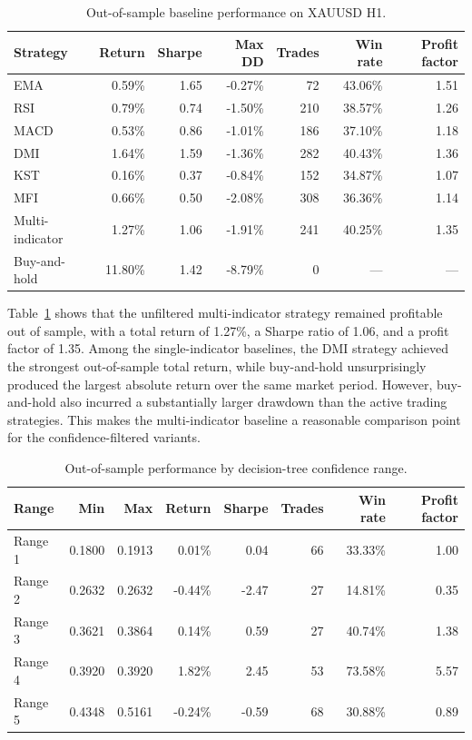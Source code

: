\begin{table}[htbp]
\centering
\caption{Out-of-sample baseline performance on XAUUSD H1.}
\label{tab:xauusd-h1-baselines}
\footnotesize
\begin{tabular}{lrrrrrr}
\toprule
Strategy & Return & Sharpe & Max DD & Trades & Win rate & Profit factor \\
\midrule
EMA & 0.59\% & 1.65 & -0.27\% & 72  & 43.06\% & 1.51 \\
RSI & 0.79\% & 0.74 & -1.50\% & 210 & 38.57\% & 1.26 \\
MACD & 0.53\% & 0.86 & -1.01\% & 186 & 37.10\% & 1.18 \\
DMI & 1.64\% & 1.59 & -1.36\% & 282 & 40.43\% & 1.36 \\
KST & 0.16\% & 0.37 & -0.84\% & 152 & 34.87\% & 1.07 \\
MFI & 0.66\% & 0.50 & -2.08\% & 308 & 36.36\% & 1.14 \\
Multi-indicator & 1.27\% & 1.06 & -1.91\% & 241 & 40.25\% & 1.35 \\
Buy-and-hold & 11.80\% & 1.42 & -8.79\% & 0 & --- & --- \\
\bottomrule
\end{tabular}
\end{table}

Table~\ref{tab:xauusd-h1-baselines} shows that the unfiltered multi-indicator
strategy remained profitable out of sample, with a total return of 1.27\%, a
Sharpe ratio of 1.06, and a profit factor of 1.35. Among the single-indicator
baselines, the DMI strategy achieved the strongest out-of-sample total return,
while buy-and-hold unsurprisingly produced the largest absolute return over the
same market period. However, buy-and-hold also incurred a substantially larger
drawdown than the active trading strategies. This makes the multi-indicator
baseline a reasonable comparison point for the confidence-filtered variants.

\begin{table}[htbp]
\centering
\caption{Out-of-sample performance by decision-tree confidence range.}
\label{tab:xauusd-h1-confidence}
\footnotesize
\begin{tabular}{lrrrrrrr}
\toprule
Range & Min & Max & Return & Sharpe & Trades & Win rate & Profit factor \\
\midrule
Range 1 & 0.1800 & 0.1913 & 0.01\%  & 0.04  & 66 & 33.33\% & 1.00 \\
Range 2 & 0.2632 & 0.2632 & -0.44\% & -2.47 & 27 & 14.81\% & 0.35 \\
Range 3 & 0.3621 & 0.3864 & 0.14\%  & 0.59  & 27 & 40.74\% & 1.38 \\
Range 4 & 0.3920 & 0.3920 & 1.82\%  & 2.45  & 53 & 73.58\% & 5.57 \\
Range 5 & 0.4348 & 0.5161 & -0.24\% & -0.59 & 68 & 30.88\% & 0.89 \\
\bottomrule
\end{tabular}
\end{table}

